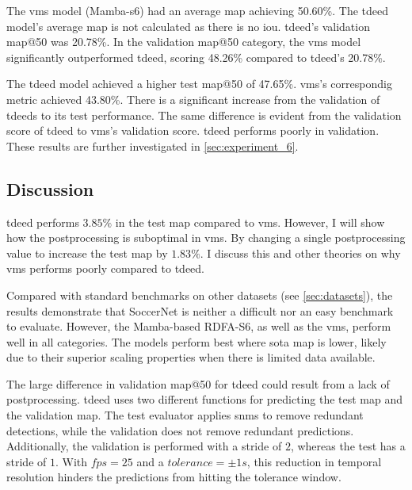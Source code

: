 The \acrshort{vms} model (Mamba-\acrshort{s6}) had an average \acrshort{map} achieving 50.60\%. The \acrshort{tdeed} model's average \acrshort{map} is not calculated as there is no \acrshort{iou}. \acrshort{tdeed}'s validation \acrshort{map}@50 was 20.78\%. In the validation \acrshort{map}@50 category, the \acrshort{vms} model significantly outperformed \acrshort{tdeed}, scoring 48.26\% compared to \acrshort{tdeed}'s 20.78\%.

The \acrshort{tdeed} model achieved a higher test \acrshort{map}@50 of 47.65\%. \acrshort{vms}'s correspondig metric achieved 43.80\%. There is a significant increase from the validation of \acrshort{tdeed}s to its test performance. The same difference is evident from the validation score of \acrshort{tdeed} to \acrshort{vms}'s validation score. \acrshort{tdeed} performs poorly in validation. These results are further investigated in \cref{sec:experiment_6}.

\subsection{Discussion}
\label{ssec:ex1_discussion}

\acrshort{tdeed} performs $3.85\%$ in the test \acrshort{map} compared to \acrshort{vms}. However, I will show how the postprocessing is suboptimal in \acrshort{vms}. By changing a single postprocessing value to increase the test \acrshort{map} by $1.83\%$. I discuss this and other theories on why \acrshort{vms} performs poorly compared to \acrshort{tdeed}. 

Compared with standard benchmarks on other datasets (see \cref{sec:datasets}), the results demonstrate that SoccerNet is neither a difficult nor an easy benchmark to evaluate. However, the Mamba-based RDFA-S6, as well as the \acrshort{vms}, perform well in all categories. The models perform best where \acrlong{sota} \acrshort{map} is lower, likely due to their superior scaling properties when there is limited data available. 

The large difference in validation \acrshort{map}@50 for \acrshort{tdeed} could result from a lack of postprocessing. \acrshort{tdeed} uses two different functions for predicting the test \acrshort{map} and the validation \acrshort{map}. The test evaluator applies \acrfull{snms} to remove redundant detections, while the validation does not remove redundant predictions. Additionally, the validation is performed with a stride of \(2\), whereas the test has a stride of \(1\). With \(fps=25\) and a \(tolerance = \pm1s\), this reduction in temporal resolution hinders the predictions from hitting the tolerance window. 

